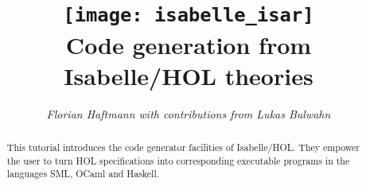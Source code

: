 \documentclass[12pt,a4paper,fleqn]{article}
\title{\texttt{[image: isabelle\_isar]}
  \\[4ex] Code generation from Isabelle/HOL theories}
\author{\emph{Florian Haftmann with contributions from Lukas Bulwahn}}
\begin{document}
\maketitle

\begin{abstract}
  \noindent This tutorial introduces the code generator facilities of Isabelle/HOL.
    They empower the user to turn HOL specifications into corresponding executable
    programs in the languages SML, OCaml and Haskell.
\end{abstract}

\thispagestyle{empty}\clearpage

\clearfirst








\begingroup
 \small\raggedright\frenchspacing

\endgroup
\end{document}
